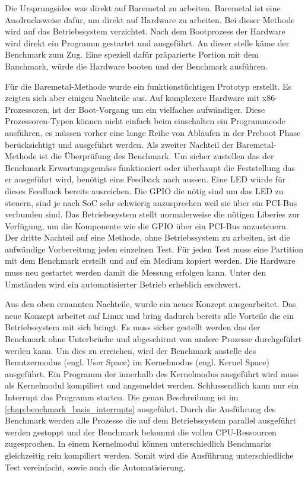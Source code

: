 \par
Die Ursprungsidee was direkt auf Baremetal zu arbeiten. Baremetal ist eine Ausdrucksweise dafür, um direkt auf Hardware zu arbeiten. Bei dieser Methode wird auf das Betriebssystem verzichtet. Nach dem Bootprozess der Hardware wird direkt ein Programm gestartet und ausgeführt. An dieser stelle käme der Benchmark zum Zug. Eine speziell dafür präparierte Portion mit dem Banchmark, würde die Hardware booten und der Benchmark ausführen.
\par
Für die Baremetal-Methode wurde ein funktionstüchtigen Prototyp erstellt. Es zeigten sich aber einigen Nachteile aus. Auf komplexere Hardware mit x86-Prozessoren, ist der Boot-Vorgang um ein vielfaches aufwändiger\cite{intel_boot_process}. Diese Prozessoren-Typen können nicht einfach beim einschalten ein Programmcode ausführen, es müssen vorher eine lange Reihe von Abläufen in der Preboot Phase berücksichtigt und ausgeführt werden. Als zweiter Nachteil der Baremetal-Methode ist die Überprüfung des Benchmark. Um sicher zustellen das der Benchmark Erwartungsgemäss funktioniert oder überhaupt die Feststellung das er ausgeführt wird, benötigt eine Feedback nach aussen. Eine LED würde für dieses Feedback bereits ausreichen. Die GPIO die nötig sind um das LED zu steuern, sind je nach SoC sehr schwierig anzusprechen weil sie über ein PCI-Bus verbunden sind. Das Betriebssystem stellt normalerweise die nötigen Liberies zur Verfügung, um die Komponente wie die GPIO über ein PCI-Bus anzusteuern. Der dritte Nachteil auf eine Methode, ohne Betriebssystem zu arbeiten, ist die aufwändige Vorbereitung jeden einzelnen Test. Für jeden Test muss eine Partition mit dem Benchmark erstellt und auf ein Medium kopiert werden. Die Hardware muss neu gestartet werden
damit die Messung erfolgen kann. Unter den Umständen wird ein automatisierter Betrieb erheblich erschwert.
\par
Aus den oben ernannten Nachteile, wurde ein neues Konzept ausgearbeitet. Das neue Konzept arbeitet auf Linux und bring dadurch bereits alle Vorteile die ein Betriebssystem mit sich bringt. Es muss sicher gestellt werden das der Benchmark ohne Unterbrüche und abgeschirmt von andere Prozesse durchgeführt werden kann. Um dies zu erreichen, wird der Benchmark anstelle des Benutzermodus (engl. User Space) im Kernelmodus (engl. Kernel Space) ausgeführt\cite{Mandl2010}. Ein Programm der innerhalb des Kernelmodus ausgeführt wird muss als Kernelmodul kompiliert und angemeldet werden. Schlussendlich kann nur ein Interrupt das Programm starten. Die genau Beschreibung ist im \autoref{chap:benchmark_basis_interrupts} ausgeführt. Durch die Ausführung des Benchmark werden alle Prozesse die auf dem Betriebssystem parallel ausgeführt werden gestoppt und der Benchmark bekommt die vollen CPU-Ressourcen zugesprochen. In einem Kernelmodul können unterschiedlich Benchmarks gleichzeitig rein kompiliert werden. Somit wird die Ausführung unterschiedliche Test vereinfacht, sowie auch die Automatisierung.

 



 

